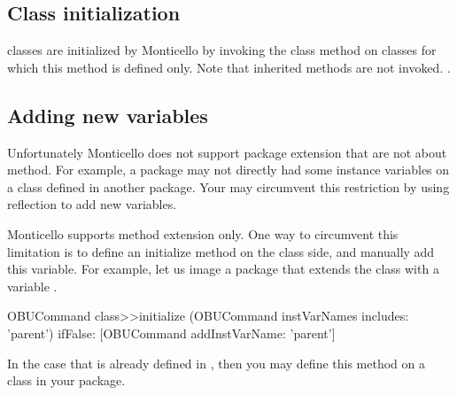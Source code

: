 \documentclass[a4paper,10pt,twoside]{book}
\begin{document}
\subsection{Class initialization}

 classes are initialized by Monticello by invoking the  class method on classes for which this method is defined only. Note that inherited  methods are not invoked.
.

\subsection{Adding new variables}

Unfortunately Monticello does not support package extension that are not about method. For example, a package may not directly had some instance variables on a class defined in another package. Your may circumvent this restriction by using reflection to add new variables. 


Monticello supports method extension only. One way to circumvent this limitation is to define an initialize method on the class side, and manually add this variable. For example, let us image  a package that extends the class  with a variable .

\begin{code}{}
OBUCommand class>>initialize
	(OBUCommand instVarNames includes: 'parent') 
		ifFalse: [OBUCommand addInstVarName: 'parent']
\end{code}

In the case that  is already defined in , then you may define this  method on a class in your package.

\end{document}
